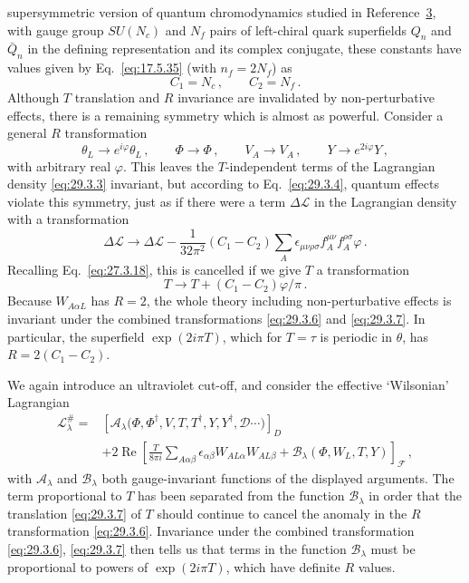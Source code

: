 supersymmetric version of quantum chromodynamics studied in
Reference~\hyperref[ch29-ref-3]{3}, with gauge group \(SU(N_c)\) and
\(N_f\) pairs of left-chiral quark superfields \(Q_n\) and \(\bar Q_n\)
in the defining representation and its complex conjugate, these constants
have values given by Eq.~\eqref{eq:17.5.35} (with \(n_f=2N_f\)) as
\[
  C_1=N_c\,,
  \qquad
  C_2=N_f\,.
\]
Although \(T\) translation and \(R\) invariance are invalidated by
non-perturbative effects, there is a remaining symmetry which is almost as
powerful. Consider a general \(R\) transformation
\begin{equation}
  \theta_L\longrightarrow e^{i\varphi}\theta_L\,,
  \qquad
  \Phi\longrightarrow\Phi\,,
  \qquad
  V_A\longrightarrow V_A\,,
  \qquad
  Y\longrightarrow e^{2i\varphi}Y\,,
  \tag{29.3.6}\label{eq:29.3.6}
\end{equation}
with arbitrary real \(\varphi\). This leaves the \(T\)-independent terms
of the Lagrangian density \eqref{eq:29.3.3} invariant, but according to
Eq.~\eqref{eq:29.3.4}, quantum effects violate this symmetry, just as if
there were a term \(\Delta\mathcal{L}\) in the Lagrangian density with a
transformation
\[
  \Delta\mathcal{L}
  \longrightarrow
  \Delta\mathcal{L}
  -\frac{1}{32\pi^2}(C_1-C_2)
  \sum_A\epsilon_{\mu\nu\rho\sigma}
  f_A^{\mu\nu}f_A^{\rho\sigma}\varphi\,.
\]
Recalling Eq.~\eqref{eq:27.3.18}, this is cancelled if we give \(T\) a
transformation
\begin{equation}
  T\longrightarrow T+(C_1-C_2)\varphi/\pi\,.
  \tag{29.3.7}\label{eq:29.3.7}
\end{equation}
Because \(W_{A\alpha L}\) has \(R=2\), the whole theory including
non-perturbative effects is invariant under the combined transformations
\eqref{eq:29.3.6} and \eqref{eq:29.3.7}. In particular, the superfield
\(\exp(2i\pi T)\), which for \(T=\tau\) is periodic in \(\theta\), has
\(R=2(C_1-C_2)\).

We again introduce an ultraviolet cut-off, and consider the effective
`Wilsonian' Lagrangian
\begin{equation}
  \begin{aligned}
  \mathcal{L}^{\#}_\lambda
  ={}&
  \left[
    \mathcal{A}_\lambda
    \bigl(\Phi,\Phi^\dagger,V,T,T^\dagger,Y,Y^\dagger,
    \mathcal{D}\cdots\bigr)
  \right]_D
  \\
  &+2\operatorname{Re}
  \left[
    \frac{T}{8\pi i}
    \sum_{A\alpha\beta}
    \epsilon_{\alpha\beta}W_{AL\alpha}W_{AL\beta}
    +\mathcal{B}_\lambda(\Phi,W_L,T,Y)
  \right]_{\mathcal{F}}\,,
  \end{aligned}
  \tag{29.3.8}\label{eq:29.3.8}
\end{equation}
with \(\mathcal{A}_\lambda\) and \(\mathcal{B}_\lambda\) both
gauge-invariant functions of the displayed arguments. The term
proportional to \(T\) has been separated from the function
\(\mathcal{B}_\lambda\) in order that the translation
\eqref{eq:29.3.7} of \(T\) should continue to cancel the anomaly in the
\(R\) transformation \eqref{eq:29.3.6}. Invariance under the combined
transformation \eqref{eq:29.3.6}, \eqref{eq:29.3.7} then tells us that
terms in the function \(\mathcal{B}_\lambda\) must be proportional to
powers of \(\exp(2i\pi T)\), which have definite \(R\) values.

